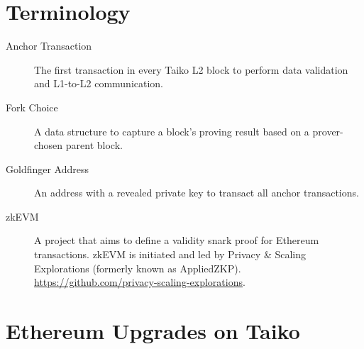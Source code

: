 \documentclass[9pt,oneside]{amsart}
\begin{document}



\appendix

\section{Terminology} \label{ch:Terminology}

\begin{description}
\item[Anchor Transaction] The first transaction in every Taiko L2 block to perform data validation and L1-to-L2 communication.


\item[Fork Choice] A data structure to capture a block's proving result based on a prover-chosen parent block.

\item[Goldfinger Address] An address with a revealed private key to transact all anchor transactions.

\item[zkEVM] A project that aims to define a validity snark proof for Ethereum transactions. zkEVM is initiated and led by 
Privacy \& Scaling Explorations (formerly known as AppliedZKP). \\ 
\url{https://github.com/privacy-scaling-explorations}.
\end{description}


\section{Ethereum Upgrades on Taiko}\label{sec:eips}
\end{document}
